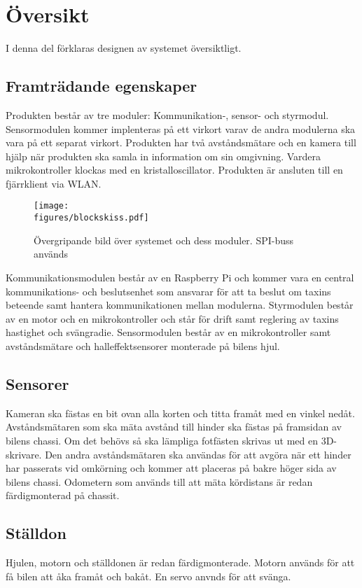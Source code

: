 \documentclass[tekniskrapport/tech.tex]{subfiles}
\begin{document}
\section{Översikt}
I denna del förklaras designen av systemet översiktligt.

\subsection{Framträdande egenskaper}
Produkten består av tre moduler: Kommunikation-, sensor- och styrmodul.
Sensormodulen kommer implenteras på ett virkort varav de andra modulerna ska
vara på ett separat virkort. Produkten har två avståndsmätare och en kamera
till hjälp när produkten ska samla in information om sin omgivning. Vardera
mikrokontroller klockas med en kristalloscillator. Produkten är ansluten till en
fjärrklient via WLAN.

\begin{figure}[h]
    \centering
    \texttt{[image: \\figures/blockskiss.pdf]}
    \caption{Övergripande bild över systemet och dess moduler. SPI-buss används}
    \label{fig:overview}
\end{figure}

\noindent
Kommunikationsmodulen består av en Raspberry Pi och kommer vara en central
kommun\-ikations- och beslutsenhet som ansvarar för att ta beslut om taxins
beteende samt hantera kommunikationen mellan modulerna. Styrmodulen består av
en motor och en mikrokontroller och står för drift samt reglering av taxins
hastighet och svängradie. Sensormodulen består av en mikrokontroller samt
avståndsmätare och halleffektsensorer monterade på bilens hjul.

\subsection{Sensorer}
Kameran ska fästas en bit ovan alla korten och titta framåt med en vinkel
nedåt. Avståndsmätaren som ska mäta avstånd till hinder ska fästas på framsidan
av bilens chassi. Om det behövs så ska lämpliga fotfästen skrivas ut med en
3D-skrivare. Den andra avståndsmätaren ska användas för att avgöra när ett
hinder har passerats vid omkörning och kommer att placeras på bakre höger sida
av bilens chassi. Odometern som används till att mäta kördistans är redan
färdigmonterad på chassit.

\subsection{Ställdon}
Hjulen, motorn och ställdonen är redan färdigmonterade. Motorn används
för att få bilen att åka framåt och bakåt. En servo anvnds för att svänga.
\end{document}
